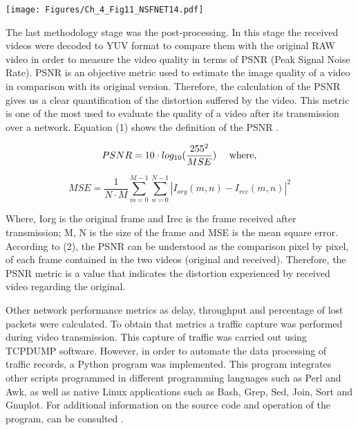 \begin{center}
\texttt{[image: Figures/Ch\_4\_Fig11\_NSFNET14.pdf]}
\label{ch4_fig:11}       %
\end{center}


The last methodology stage was the post-processing. In this stage the received videos were decoded to YUV format to compare them with the original RAW video in order to measure the video quality in terms of PSNR (Peak Signal Noise Rate). PSNR is an objective metric used to estimate the image quality of a video in comparison with its original version. Therefore, the calculation of the PSNR gives us a clear quantification of the distortion suffered by the video. This metric is one of the most used to evaluate the quality of a video after its transmission over a network. Equation (1) shows the definition of the PSNR \cite{bing_2015}.

\begin{equation}
    PSNR=10 \cdot log_{10}( \dfrac{255^2}{MSE}) \ \ \ \ \textup{where,}
\end{equation}

\begin{equation}
    MSE=\frac{1}{N \cdot M} \sum^{M-1}_{m=0} \sum^{N-1}_{n=0} |I_{org} (m,n) - I_{rec} (m,n)|^2
\end{equation}


Where, Iorg is the original frame and Irec is the frame received after transmission; M, N is the size of the frame and MSE is the mean square error. According to (2), the PSNR can be understood as the comparison pixel by pixel, of each frame contained in the two videos (original and received). Therefore, the PSNR metric is a value that indicates the distortion experienced by received video regarding the original.

Other network performance metrics as delay, throughput and percentage of lost packets were calculated. To obtain that metrics a traffic capture was performed during video transmission. This capture of traffic was carried out using TCPDUMP software. However, in order to automate the data processing of traffic records, a Python program was implemented. This program integrates other scripts programmed in different programming languages such as Perl and Awk, as well as native Linux applications such as Bash, Grep, Sed, Join, Sort and Gnuplot. For additional information on the source code and operation of the program, can be consulted \cite{bustos_2019}.

